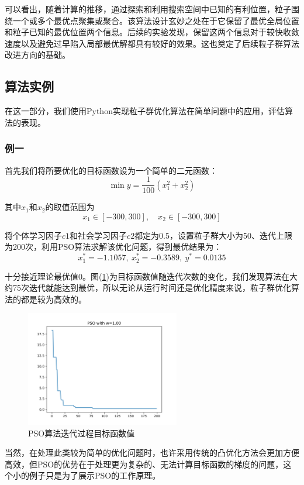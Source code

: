 \documentclass[lang=cn,12pt,a4paper,cite=authoryear]{elegantpaper}
\begin{document}
可以看出，随着计算的推移，通过探索和利用搜索空间中已知的有利位置，粒子围绕一个或多个最优点聚集或聚合。该算法设计玄妙之处在于它保留了最优全局位置和粒子已知的最优位置两个信息。后续的实验发现，保留这两个信息对于较快收敛速度以及避免过早陷入局部最优解都具有较好的效果。这也奠定了后续粒子群算法改进方向的基础。

\subsection{算法实例}

在这一部分，我们使用Python实现粒子群优化算法在简单问题中的应用，评估算法的表现。

\subsubsection{例一}

首先我们将所要优化的目标函数设为一个简单的二元函数：
$$\min y = \frac{1}{100}(x_1^2 + x_2^2)$$

其中$x_1$和$x_2$的取值范围为
$$x_1 \in [-300, 300], \quad x_2 \in [-300, 300]$$

将个体学习因子$c1$和社会学习因子$c2$都定为0.5，设置粒子群大小为50、迭代上限为200次，利用PSO算法求解该优化问题，得到最优结果为：
$$x_1^*=-1.1057,\ x_2^*=-0.3589,\ y^*= 0.0135$$

十分接近理论最优值0。图(\ref{fig2})为目标函数值随迭代次数的变化，我们发现算法在大约75次迭代就能达到最优，所以无论从运行时间还是优化精度来说，粒子群优化算法的都是较为高效的。

\begin{figure}[H]
	\centering
	\includegraphics[width=0.6\textwidth]{image/fig1.png}
	\caption{PSO算法迭代过程目标函数值}
	\label{fig2}
\end{figure}

当然，在处理此类较为简单的优化问题时，也许采用传统的凸优化方法会更加方便高效，但PSO的优势在于处理更为复杂的、无法计算目标函数的梯度的问题，这个小的例子只是为了展示PSO的工作原理。
\end{document}
